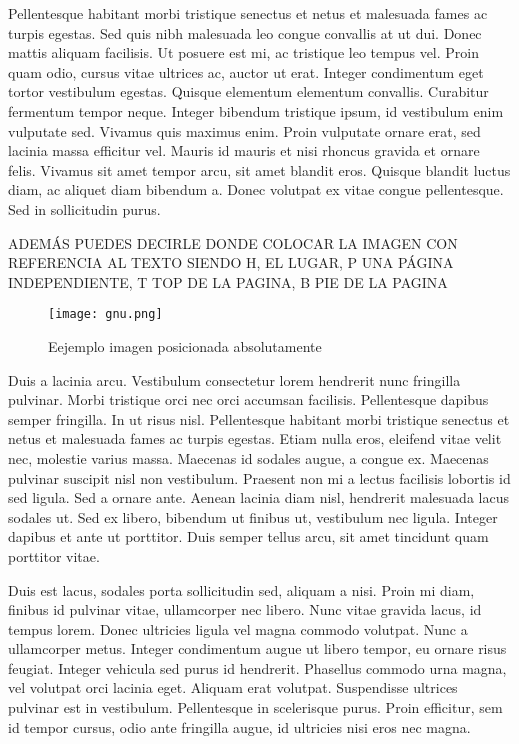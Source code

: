 Pellentesque habitant morbi tristique senectus et netus et malesuada fames ac turpis egestas. Sed quis nibh malesuada leo congue convallis at ut dui. Donec mattis aliquam facilisis. Ut posuere est mi, ac tristique leo tempus vel. Proin quam odio, cursus vitae ultrices ac, auctor ut erat. Integer condimentum eget tortor vestibulum egestas. Quisque elementum elementum convallis. Curabitur fermentum tempor neque. Integer bibendum tristique ipsum, id vestibulum enim vulputate sed. Vivamus quis maximus enim. Proin vulputate ornare erat, sed lacinia massa efficitur vel. Mauris id mauris et nisi rhoncus gravida et ornare felis. Vivamus sit amet tempor arcu, sit amet blandit eros. Quisque blandit luctus diam, ac aliquet diam bibendum a. Donec volutpat ex vitae congue pellentesque. Sed in sollicitudin purus.

ADEMÁS PUEDES DECIRLE DONDE COLOCAR LA IMAGEN CON REFERENCIA AL TEXTO
SIENDO H, EL LUGAR, P UNA PÁGINA INDEPENDIENTE, T TOP DE LA PAGINA, B PIE DE LA PAGINA
\begin{figure}[h]
\begin{center}
\texttt{[image: gnu.png]}
\end{center}
\caption{Eejemplo imagen posicionada absolutamente}
\end{figure}

Duis a lacinia arcu. Vestibulum consectetur lorem hendrerit nunc fringilla pulvinar. Morbi tristique orci nec orci accumsan facilisis. Pellentesque dapibus semper fringilla. In ut risus nisl. Pellentesque habitant morbi tristique senectus et netus et malesuada fames ac turpis egestas. Etiam nulla eros, eleifend vitae velit nec, molestie varius massa. Maecenas id sodales augue, a congue ex. Maecenas pulvinar suscipit nisl non vestibulum. Praesent non mi a lectus facilisis lobortis id sed ligula. Sed a ornare ante. Aenean lacinia diam nisl, hendrerit malesuada lacus sodales ut. Sed ex libero, bibendum ut finibus ut, vestibulum nec ligula. Integer dapibus et ante ut porttitor. Duis semper tellus arcu, sit amet tincidunt quam porttitor vitae.

Duis est lacus, sodales porta sollicitudin sed, aliquam a nisi. Proin mi diam, finibus id pulvinar vitae, ullamcorper nec libero. Nunc vitae gravida lacus, id tempus lorem. Donec ultricies ligula vel magna commodo volutpat. Nunc a ullamcorper metus. Integer condimentum augue ut libero tempor, eu ornare risus feugiat. Integer vehicula sed purus id hendrerit. Phasellus commodo urna magna, vel volutpat orci lacinia eget. Aliquam erat volutpat. Suspendisse ultrices pulvinar est in vestibulum. Pellentesque in scelerisque purus. Proin efficitur, sem id tempor cursus, odio ante fringilla augue, id ultricies nisi eros nec magna.

